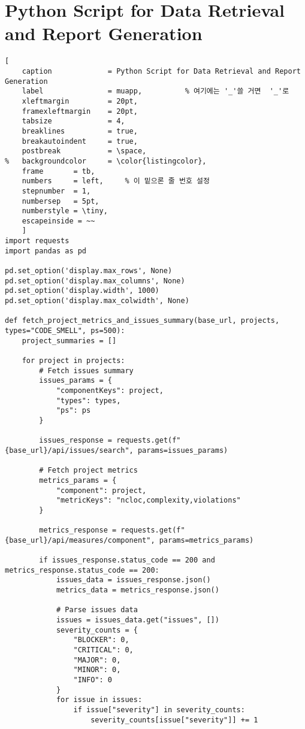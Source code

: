 \section{Python Script for Data Retrieval and Report Generation} \label{app:a3}

\begin{lstlisting}[
	caption				= Python Script for Data Retrieval and Report Generation
	label				= muapp,          % 여기에는 '_'쓸 거면  '_'로
	xleftmargin			= 20pt,
	framexleftmargin	= 20pt,
	tabsize				= 4,
	breaklines			= true,
	breakautoindent		= true,
	postbreak			= \space,
%	backgroundcolor		= \color{listingcolor}, 
	frame		= tb,
	numbers		= left,		% 이 밑으론 줄 번호 설정
	stepnumber	= 1,
	numbersep	= 5pt,
	numberstyle	= \tiny,
	escapeinside = ~~
	]	
import requests
import pandas as pd

pd.set_option('display.max_rows', None)  
pd.set_option('display.max_columns', None) 
pd.set_option('display.width', 1000)  
pd.set_option('display.max_colwidth', None)

def fetch_project_metrics_and_issues_summary(base_url, projects, types="CODE_SMELL", ps=500):
    project_summaries = []  

    for project in projects:
        # Fetch issues summary
        issues_params = {
            "componentKeys": project,
            "types": types,
            "ps": ps
        }

        issues_response = requests.get(f"{base_url}/api/issues/search", params=issues_params)

        # Fetch project metrics
        metrics_params = {
            "component": project,
            "metricKeys": "ncloc,complexity,violations"
        }

        metrics_response = requests.get(f"{base_url}/api/measures/component", params=metrics_params)

        if issues_response.status_code == 200 and metrics_response.status_code == 200:
            issues_data = issues_response.json()
            metrics_data = metrics_response.json()

            # Parse issues data
            issues = issues_data.get("issues", [])
            severity_counts = {
                "BLOCKER": 0,
                "CRITICAL": 0,
                "MAJOR": 0,
                "MINOR": 0,
                "INFO": 0
            }
            for issue in issues:
                if issue["severity"] in severity_counts:
                    severity_counts[issue["severity"]] += 1


\end{lstlisting}

